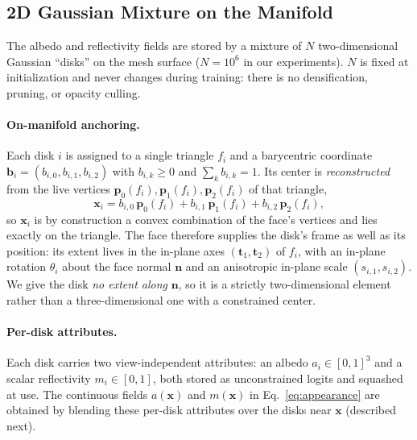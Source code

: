 \subsection{2D Gaussian Mixture on the Manifold}
\label{sec:gmm}
The albedo and reflectivity fields are stored by a mixture of $N$ two-dimensional Gaussian
``disks'' on the mesh surface ($N{=}10^6$ in our experiments). $N$ is fixed at initialization and
never changes during training: there is no densification, pruning, or opacity culling.

\paragraph{On-manifold anchoring.}
Each disk $i$ is assigned to a single triangle $f_i$ and a barycentric coordinate
$\mathbf{b}_i=(b_{i,0},b_{i,1},b_{i,2})$ with $b_{i,k}\ge 0$ and $\sum_k b_{i,k}=1$.
Its center is \emph{reconstructed} from the live vertices $\mathbf{p}_0(f_i), \mathbf{p}_1(f_i), \mathbf{p}_2(f_i)$ of that triangle,
%
\begin{equation}
\mathbf{x}_i = b_{i,0}\,\mathbf{p}_0(f_i) + b_{i,1}\,\mathbf{p}_1(f_i) + b_{i,2}\,\mathbf{p}_2(f_i),
\label{eq:center}
\end{equation}
%
so $\mathbf{x}_i$ is by construction a convex combination of the face's vertices and lies exactly on
the triangle. The face therefore supplies the disk's frame as well as its position: its extent lives
in the in-plane axes $(\mathbf{t}_1,\mathbf{t}_2)$ of $f_i$, with an in-plane rotation $\theta_i$
about the face normal $\mathbf{n}$ and an anisotropic in-plane scale $(s_{i,1},s_{i,2})$. We give
the disk \emph{no extent along} $\mathbf{n}$, so it is a strictly two-dimensional element rather
than a three-dimensional one with a constrained center.

\paragraph{Per-disk attributes.}
Each disk carries two view-independent attributes: an albedo $a_i\in[0,1]^3$ and a scalar reflectivity $m_i\in[0,1]$, both stored as unconstrained logits and squashed at use.
The continuous fields $a(\mathbf{x})$ and $m(\mathbf{x})$ in Eq.~\eqref{eq:appearance} are obtained by blending these per-disk attributes over the disks near $\mathbf{x}$ (described next).

